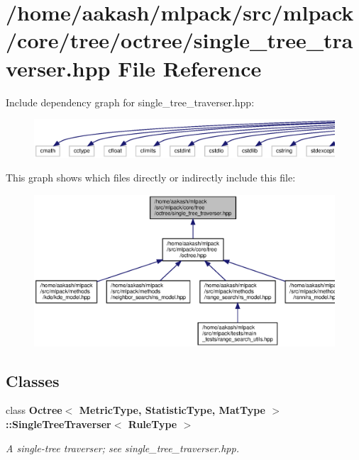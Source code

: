 \section{/home/aakash/mlpack/src/mlpack/core/tree/octree/single\+\_\+tree\+\_\+traverser.hpp File Reference}
\label{octree_2single__tree__traverser_8hpp}
Include dependency graph for single\+\_\+tree\+\_\+traverser.\+hpp\+:
\nopagebreak
\begin{figure}[H]
\begin{center}
\leavevmode
\includegraphics[width=350pt]{octree_2single__tree__traverser_8hpp__incl}
\end{center}
\end{figure}
This graph shows which files directly or indirectly include this file\+:
\nopagebreak
\begin{figure}[H]
\begin{center}
\leavevmode
\includegraphics[width=350pt]{octree_2single__tree__traverser_8hpp__dep__incl}
\end{center}
\end{figure}
\subsection*{Classes}
\begin{DoxyCompactItemize}
\item 
class \textbf{ Octree$<$ Metric\+Type, Statistic\+Type, Mat\+Type $>$\+::\+Single\+Tree\+Traverser$<$ Rule\+Type $>$}
\begin{DoxyCompactList}\small\item\em A single-\/tree traverser; see single\+\_\+tree\+\_\+traverser.\+hpp. \end{DoxyCompactList}\end{DoxyCompactItemize}
